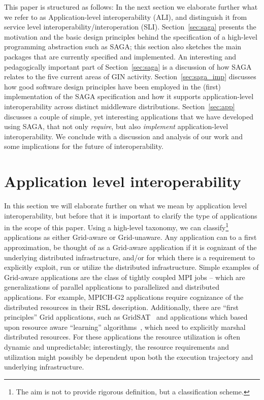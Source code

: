 \documentclass[conference,final]{IEEEtran}
\newcommand{\I}{\textit}
\begin{document}

\noindent This paper is structured as follows: In the next section we
elaborate further what we refer to as Application-level
interoperability (ALI), and distinguish it from service level
interoperability/interoperation (SLI).  Section~\ref{sec:saga}
presents the motivation and the basic design principles behind the
specification of a high-level programming abstraction such as SAGA;
this section also sketches the main packages that are currently
specified and implemented. An interesting and pedagogically important
part of Section~\ref{sec:saga} is a discussion of how SAGA relates to
the five current areas of GIN activity.  Section~\ref{sec:saga_imp}
discusses how good software design principles have been employed in
the (first) implementation of the SAGA specification and how it
supports application-level interoperability across distinct middleware
distributions.  Section~\ref{sec:app} discusses a couple of simple,
yet interesting applications that we have developed using SAGA, that
not only \I{require}, but also \I{implement} application-level
interoperability.  We conclude with a discussion and analysis of our
work and some implications for the future of interoperability.

\section{Application level interoperability}\label{sec:ALI}

In this section we will elaborate further on what we mean by
application level interoperability, but before that it is important to
clarify the type of applications in the scope of this paper.  Using a
high-level taxonomy, we can classify\footnote{The aim is not to
  provide rigorous definition, but a classification scheme.}
applications as either Grid-aware or Grid-unaware.  Any application
can to a first approximation, be thought of as a Grid-aware
application if it is cognizant of the underlying distributed
infrastructure, and/or for which there is a requirement to explicitly
exploit, run or utilize the distributed infrastructure.  Simple
examples of Grid-aware applications are the class of tightly coupled
MPI jobs -- which are generalizations of parallel applications to
parallelized and distributed applications.  For example, MPICH-G2
applications require cognizance of the distributed resources in their
RSL description.  Additionally, there are ``first principles'' Grid
applications, such as GridSAT~\cite{gridsat03} and applications which
based upon resource aware ``learning'' algorithms~\cite{
  majority_voting}, which need to explicitly marshal distributed
resources. For these applications the resource utilization is often
dynamic and unpredictable; interestingly, the resource requirements
and utilization might possibly be dependent upon both the execution
trajectory and underlying infrastructure.
\end{document}
